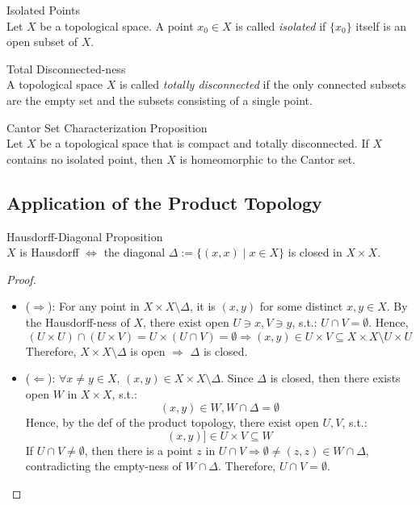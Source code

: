 \begin{definition}{Isolated Points}\\
Let $X$ be a topological space. A point $x_0 \in X$ is called \textit{isolated} if $\{x_0\}$ itself is an open subset of $X$.
\end{definition}

\begin{definition}{Total Disconnected-ness}\\
A topological space $X$ is called \textit{totally disconnected} if the only connected subsets are the empty set and the subsets consisting of a single point.
\end{definition}

\begin{proposition}{Cantor Set Characterization Proposition}\\
Let $X$ be a topological space that is compact and totally disconnected. If $X$ contains no isolated point, then $X$ is homeomorphic to the Cantor set.
\end{proposition}

\subsection{Application of the Product Topology}

\begin{proposition}{Hausdorff-Diagonal Proposition}\\
$X$ is Hausdorff $\Leftrightarrow$ the diagonal $\Delta := \{ (x,x) \mid x \in X\}$ is closed in $X \times X$.
\end{proposition}

\begin{proof}
    \begin{itemize}
        \item ($\Rightarrow$): For any point in $X \times X \setminus \Delta$, it is $(x,y)$ for some distinct $x,y \in X$. By the Hausdorff-ness of $X$, there exist open $U \ni x, V \ni y$, s.t.: $U \cap V =\emptyset$. Hence, 
        $$(U \times U) \cap (U \times V) = U \times (U \cap V) = \emptyset \Rightarrow (x,y) \in U \times V \subseteq X \times X \setminus U \times U$$
        Therefore, $X \times X \setminus \Delta$ is open $\Rightarrow$ $\Delta$ is closed.

        \item ($\Leftarrow$): $\forall x \neq y \in X$, $(x,y) \in X \times X \setminus \Delta$. Since $\Delta$ is closed, then there exists open $W$ in $X \times X$, s.t.:
        $$(x,y) \in W, W \cap \Delta = \emptyset$$
        Hence, by the def of the product topology, there exist open $U,V$, s.t.:
        $$(x,y) ]\in U \times V \subseteq W$$
        If $U \cap V \neq \emptyset$, then there is a point $z$ in $U \cap V \Rightarrow \emptyset \neq (z,z) \in W \cap \Delta$, contradicting the empty-ness of $W \cap \Delta$. Therefore, $U \cap V =\emptyset$.
    \end{itemize}
\end{proof}

